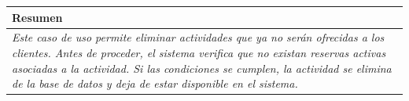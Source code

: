     \begin{table}[H]
        \begin{tabular}{llllllll}
        \hline
        \multicolumn{8}{|l|}{\cellcolor[HTML]{F2F2F2}Resumen}                                                                                                                                                                                                                                                                                                                                                                                             \\ \hline
        \multicolumn{8}{|p{15cm}|}{{\color[HTML]{808080} \textit{Este caso de uso permite eliminar actividades que ya no serán ofrecidas a los clientes. Antes de proceder, el sistema verifica que no existan reservas activas asociadas a la actividad. Si las condiciones se cumplen, la actividad se elimina de la base de datos y deja de estar disponible en el sistema.}}} \\ \hline
        \end{tabular}
    \end{table}

